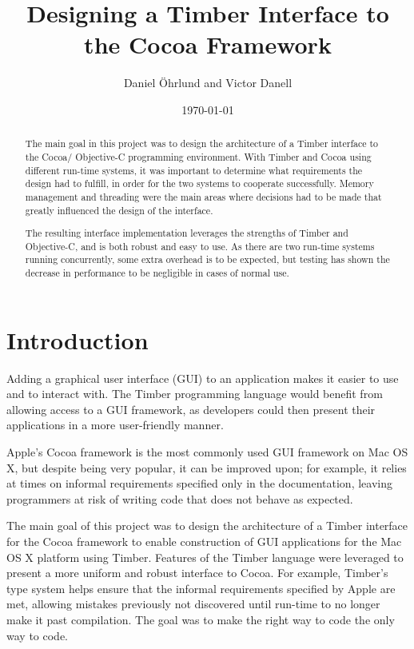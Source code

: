 \documentclass[a4paper]{article}
\begin{document}
\title{ Designing a Timber Interface to the Cocoa Framework}
\author {Daniel \"{O}hrlund and Victor Danell}
\date{\today}
\maketitle
\thispagestyle{empty}

\begin{abstract}
The main goal in this project was to design the architecture of a Timber interface to the Cocoa/ Objective-C programming environment. With Timber and Cocoa using different run-time systems, it was important to determine what requirements the design had to fulfill, in order for the two systems to cooperate successfully. Memory management and threading were the main areas where decisions had to be made that greatly influenced the design of the interface.

The resulting interface implementation leverages the strengths of Timber and Objective-C, and is both robust and easy to use. As there are two run-time systems running concurrently, some extra overhead is to be expected, but testing has shown the decrease in performance to be negligible in cases of normal use.
\end{abstract}

\newpage
\tableofcontents

\newpage
\section{Introduction}
Adding a graphical user interface (GUI) to an application makes it easier to use and to interact with. The Timber programming language \cite{timberLang} would benefit from allowing access to a GUI framework, as developers could then present their applications in a more user-friendly manner.

Apple's Cocoa framework \cite{cocoaLib} is the most commonly used GUI framework on Mac OS X, but despite being very popular, it can be improved upon; for example, it relies at times on informal requirements specified only in the documentation, leaving programmers at risk of writing code that does not behave as expected.

The main goal of this project was to design the architecture of a Timber interface for the Cocoa framework to enable construction of GUI applications for the Mac OS X platform using Timber. Features of the Timber language were leveraged to present a more uniform and robust interface to  Cocoa. For example, Timber's type system helps ensure that the informal requirements specified by Apple are met, allowing mistakes previously not discovered until run-time to no longer make it past compilation. The goal was to make the right way to code the only way to code.
\end{document}
